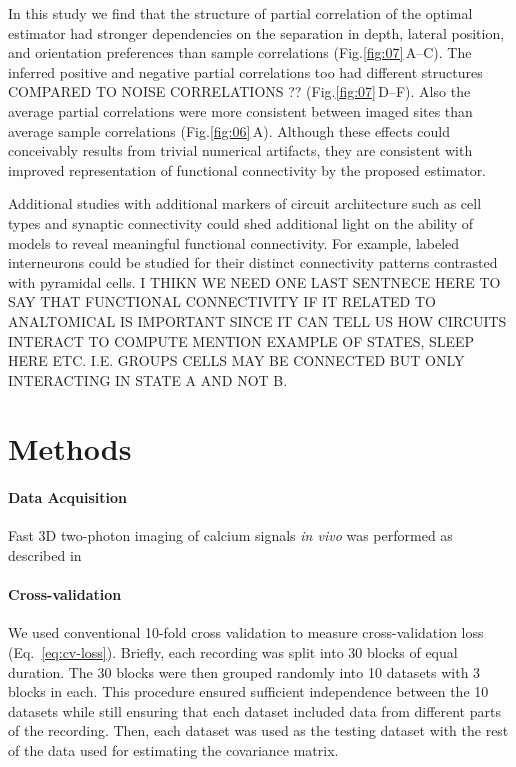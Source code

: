 \documentclass[10pt]{article}
\newcommand{\figref}[2]{Fig.\;\ref{fig:#1}\,#2}
\begin{document}
In this study we find that the structure of partial correlation of the optimal estimator had stronger dependencies on the separation in depth, lateral position, and orientation preferences than sample correlations (\figref{07}{A--C}). The inferred positive and negative partial correlations too had different structures COMPARED TO NOISE CORRELATIONS ?? (\figref{07}{D--F}).  Also the average partial correlations were more consistent between imaged sites than average sample correlations (\figref{06}{A}). Although these effects could conceivably results from trivial numerical artifacts, they are consistent with improved representation of functional connectivity by the proposed estimator.

Additional studies with additional markers of circuit architecture such as cell types and synaptic connectivity could shed additional light on the ability of models to reveal meaningful functional connectivity.  For example, labeled interneurons could be studied for their distinct connectivity patterns contrasted with pyramidal cells. I THIKN WE NEED ONE LAST SENTNECE HERE TO SAY THAT FUNCTIONAL CONNECTIVITY IF IT RELATED TO ANALTOMICAL IS IMPORTANT SINCE IT CAN TELL US HOW CIRCUITS INTERACT TO COMPUTE MENTION EXAMPLE OF STATES, SLEEP HERE ETC. I.E. GROUPS CELLS MAY BE CONNECTED BUT ONLY INTERACTING IN STATE A AND NOT B. 

\section*{Methods}
\paragraph{Data Acquisition}
Fast 3D two-photon imaging of calcium signals \emph{in vivo} was performed as described in \cite{Cotton:2013}

\paragraph{Cross-validation}
We used conventional 10-fold cross validation to measure cross-validation loss (Eq.~\ref{eq:cv-loss}). Briefly, each recording was split into 30 blocks of equal duration.  The 30 blocks were then grouped randomly into 10 datasets with 3 blocks in each.  This procedure ensured sufficient independence between the 10 datasets while still ensuring that each dataset included data from different parts of the recording.   Then, each dataset was used as the testing dataset with the rest of the data used for estimating the covariance matrix.  
\end{document}
